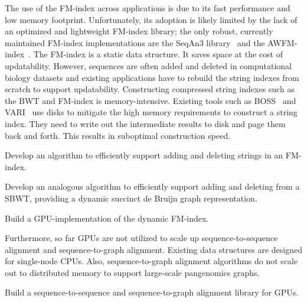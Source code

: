 The use of the FM-index across applications is due to its fast performance and low memory footprint. Unfortunately, its adoption is likely limited by the lack of an optimized and lightweight FM-index library; the only robust, currently maintained FM-index implementations are the SeqAn3 library~\cite{Reinert2017} and the AWFM-index~\cite{Anderson2021}. 
%
The FM-index is a static data structure. It saves space at the cost of updatability. However, sequences are often added and deleted in computational biology datasets and existing applications have to rebuild the string indexes from scratch to support updatability.
%
Constructing compressed string indexes such as the BWT and FM-index is memory-intensive. Existing tools such as BOSS~\cite{Bowe2012} and VARI~\cite{Muggli2019} use disks to mitigate the high memory requirements to construct a string index. They need to write out the intermediate results to disk and page them back and forth. This results in suboptimal construction speed.
%


\begin{rproblem}
Develop an algorithm to efficiently support adding and deleting strings in an FM-index.
\label{rpob:dynamic-fmindex}
\end{rproblem}

\begin{rproblem}
Develop an analogous algorithm to efficiently support adding and deleting \kmers from a SBWT, providing a dynamic succinct de Bruijn graph representation.
\label{rpob:dynamic-sbwt}
\end{rproblem}

\begin{rproblem}
Build a GPU-implementation of the dynamic FM-index.
\label{rpob:gpu-fmindex}
\end{rproblem}


Furthermore, so far GPUs are not utilized to scale up sequence-to-sequence alignment and sequence-to-graph alignment. Existing data structures are designed for single-node CPUs. Also, sequence-to-graph alignment algorithms do not scale out to distributed memory to support large-scale pangenomics graphs. 

\begin{rproblem}
Build a sequence-to-sequence and sequence-to-graph alignment library for GPUs.
\end{rproblem}

